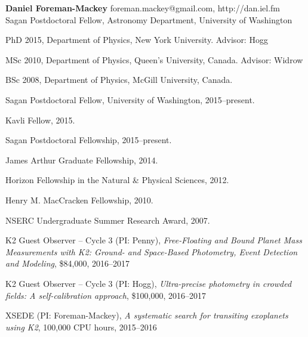 \documentclass[12pt,letterpaper]{article}
\begin{document}
\thispagestyle{empty}\sloppy\sloppypar\raggedbottom

\textbf{\Large Daniel Foreman-Mackey} \hfill
\textsf{\small foreman.mackey@gmail.com, http://dan.iel.fm} \\[0.5ex]
Sagan Postdoctoral Fellow, Astronomy Department, University of Washington\\[0.5ex]

\begin{list}{}{\cvlist}
\item
PhD 2015, Department of Physics, New York University. Advisor: Hogg
\item
MSc 2010, Department of Physics, Queen's University, Canada. Advisor: Widrow
\item
BSc 2008, Department of Physics, McGill University, Canada.
\end{list}

\begin{list}{}{\cvlist}
\item
Sagan Postdoctoral Fellow, University of Washington, 2015--present.
\end{list}

\begin{list}{}{\cvlist}

\item Kavli Fellow, 2015.
\item Sagan Postdoctoral Fellowship, 2015--present.
\item James Arthur Graduate Fellowship, 2014.
\item Horizon Fellowship in the Natural \& Physical Sciences, 2012.
\item Henry M. MacCracken Fellowship, 2010.
\item NSERC Undergraduate Summer Research Award, 2007.

\end{list}

\begin{list}{}{\cvlist}
\item
K2 Guest Observer -- Cycle 3 (PI: Penny),
\emph{Free-Floating and Bound Planet Mass Measurements with K2: Ground- and
Space-Based Photometry, Event Detection and Modeling},
\$84,000, 2016--2017
\item
K2 Guest Observer -- Cycle 3 (PI: Hogg),
\emph{Ultra-precise photometry in crowded fields: A self-calibration
approach},
\$100,000, 2016--2017
\item
XSEDE (PI: Foreman-Mackey),
\emph{A systematic search for transiting exoplanets using K2},
100,000 CPU hours, 2015--2016
\end{list}
\end{document}
